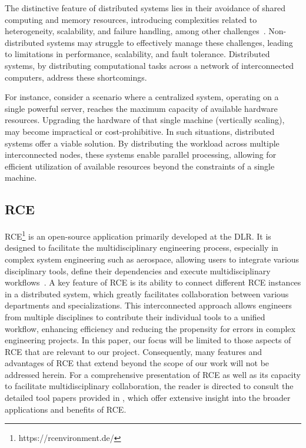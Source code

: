 The distinctive feature of distributed systems lies in their avoidance of shared computing and memory resources, introducing complexities related to heterogeneity, scalability, and failure handling, among other challenges~\cite{coulouris2005distributed}. Non-distributed systems may struggle to effectively manage these challenges, leading to limitations in performance, scalability, and fault tolerance. Distributed systems, by distributing computational tasks across a network of interconnected computers, address these shortcomings.

For instance, consider a scenario where a centralized system, operating on a single powerful server, reaches the maximum capacity of available hardware resources. Upgrading the hardware of that single machine (vertically scaling), may become impractical or cost-prohibitive. In such situations, distributed systems offer a viable solution. By distributing the workload across multiple interconnected nodes, these systems enable parallel processing, allowing for efficient utilization of available resources beyond the constraints of a single machine. 

\subsection{\acl{RCE}}
\label{subsec:rce}
\ac{RCE}\footnote{https://rcenvironment.de/} is an open-source application primarily developed at the \ac{DLR}. It is designed to facilitate the multidisciplinary engineering process, especially in complex system engineering such as aerospace, allowing users to integrate various disciplinary tools, define their dependencies and execute multidisciplinary workflows~\cite{BODEN2021100759}. A key feature of \ac{RCE} is its ability to connect different \ac{RCE} instances in a distributed system, which greatly facilitates collaboration between various departments and specializations. This interconnected approach allows engineers from multiple disciplines to contribute their individual tools to a unified workflow, enhancing efficiency and reducing the propensity for errors in complex engineering projects. In this paper, our focus will be limited to those aspects of \ac{RCE} that are relevant to our project. Consequently, many features and advantages of \ac{RCE} that extend beyond the scope of our work will not be addressed herein. For a comprehensive presentation of \ac{RCE} as well as its capacity to facilitate multidisciplinary collaboration, the reader is directed to consult the detailed tool papers provided in \cite{BODEN2021100759,boden2019distributed}, which offer extensive insight into the broader applications and benefits of \ac{RCE}.~\cite{BODEN2021100759}

